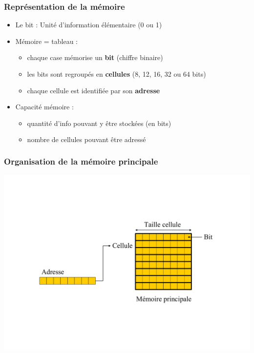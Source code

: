 \begin{frame}
\frametitle{Représentation de la mémoire}
\begin{itemize}
\item <1> Le bit : Unité d'information élémentaire (0 ou 1)
\item <2> Mémoire = tableau :
\begin{itemize}
\item chaque case mémorise un \textbf{bit} (chiffre binaire)
\item les bits sont regroupés en \textbf{cellules} (8, 12, 16, 32 ou 64 bits)
\item chaque cellule est identifiée par son \textbf{adresse}
\end{itemize}
\item <3> Capacité mémoire :
\begin{itemize}
\item quantité d’info pouvant y être stockées (en bits)
\item nombre de cellules pouvant être adressé
\end{itemize}
\end{itemize}
\end{frame}


\begin{frame}
\frametitle{Organisation de la mémoire principale}
\includegraphics[width=\textwidth]{../illustration/memoire_principale_organisation.pdf}
\end{frame}

